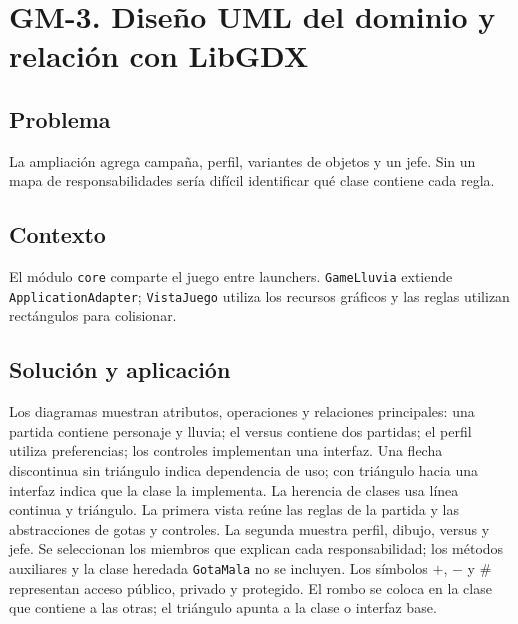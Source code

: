 \section{GM-3. Diseño UML del dominio y relación con LibGDX}

\subsection*{Problema}
La ampliación agrega campaña, perfil, variantes de objetos y un jefe. Sin un mapa de responsabilidades sería difícil identificar qué clase contiene cada regla.

\subsection*{Contexto}
El módulo \texttt{core} comparte el juego entre launchers. \texttt{GameLluvia} extiende \texttt{ApplicationAdapter}; \texttt{VistaJuego} utiliza los recursos gráficos y las reglas utilizan rectángulos para colisionar.

\subsection*{Solución y aplicación}
Los diagramas muestran atributos, operaciones y relaciones principales: una partida contiene personaje y lluvia; el versus contiene dos partidas; el perfil utiliza preferencias; los controles implementan una interfaz. Una flecha discontinua sin triángulo indica dependencia de uso; con triángulo hacia una interfaz indica que la clase la implementa. La herencia de clases usa línea continua y triángulo. La primera vista reúne las reglas de la partida y las abstracciones de gotas y controles. La segunda muestra perfil, dibujo, versus y jefe. Se seleccionan los miembros que explican cada responsabilidad; los métodos auxiliares y la clase heredada \texttt{GotaMala} no se incluyen. Los símbolos $+$, $-$ y $\#$ representan acceso público, privado y protegido. El rombo se coloca en la clase que contiene a las otras; el triángulo apunta a la clase o interfaz base.

